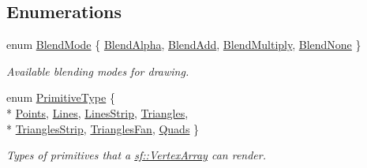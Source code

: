 \subsection*{Enumerations}
\begin{DoxyCompactItemize}
\item 
enum \hyperlink{group__graphics_ga80c52fe2f7050d7f7573b7ed3c995388}{Blend\-Mode} \{ \hyperlink{group__graphics_gga80c52fe2f7050d7f7573b7ed3c995388aaf30f92cf1471a031fce5d61e8674996}{Blend\-Alpha}, 
\hyperlink{group__graphics_gga80c52fe2f7050d7f7573b7ed3c995388afc35de7c9fe26776b839cfe0027b16da}{Blend\-Add}, 
\hyperlink{group__graphics_gga80c52fe2f7050d7f7573b7ed3c995388a8adc43071db8f20e508c35e172195234}{Blend\-Multiply}, 
\hyperlink{group__graphics_gga80c52fe2f7050d7f7573b7ed3c995388abe282fb5f49c20b6439cbec9d4f63722}{Blend\-None}
 \}
\begin{DoxyCompactList}\small\item\em Available blending modes for drawing. \end{DoxyCompactList}\item 
enum \hyperlink{group__graphics_ga5ee56ac1339984909610713096283b1b}{Primitive\-Type} \{ \\*
\hyperlink{group__graphics_gga5ee56ac1339984909610713096283b1bac7097d3e01778b9318def1f7ac35a785}{Points}, 
\hyperlink{group__graphics_gga5ee56ac1339984909610713096283b1ba2bf015eeff9f798dfc3d6d744d669f1e}{Lines}, 
\hyperlink{group__graphics_gga5ee56ac1339984909610713096283b1ba5b09910f5d0f39641342184ccd0d1de3}{Lines\-Strip}, 
\hyperlink{group__graphics_gga5ee56ac1339984909610713096283b1ba880a7aa72c20b9f9beb7eb64d2434670}{Triangles}, 
\\*
\hyperlink{group__graphics_gga5ee56ac1339984909610713096283b1ba66643dbbb24bbacb405973ed80eebae0}{Triangles\-Strip}, 
\hyperlink{group__graphics_gga5ee56ac1339984909610713096283b1ba5338a2c6d922151fe50f235036af8a20}{Triangles\-Fan}, 
\hyperlink{group__graphics_gga5ee56ac1339984909610713096283b1ba5041359b76b4bd3d3e6ef738826b8743}{Quads}
 \}
\begin{DoxyCompactList}\small\item\em Types of primitives that a \hyperlink{classsf_1_1_vertex_array}{sf\-::\-Vertex\-Array} can render. \end{DoxyCompactList}\end{DoxyCompactItemize}
